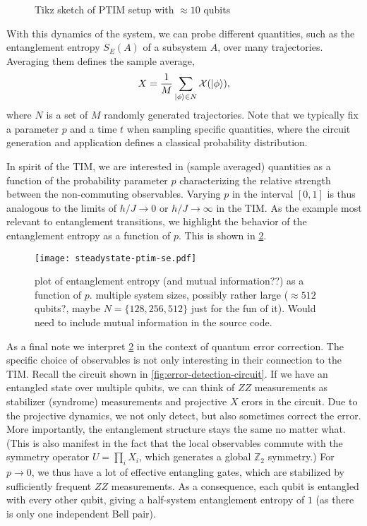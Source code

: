 \begin{figure}[t]
  \centering
  
  \caption{Tikz sketch of PTIM setup with $\approx 10$ qubits}
  \label{fig:ptim-circuit}
\end{figure}

With this dynamics of the system, we can probe different quantities, such as
the entanglement entropy $S_E(A)$ of a subsystem $A$, over many trajectories.
Averaging them defines the sample average,
\begin{align}
  X = \frac{1}{M} \sum_{\ket{\phi} \in N} \mathcal{X}(\ket{\phi})
,\end{align}
where $N$ is a set of $M$ randomly generated trajectories. Note that we
typically fix a parameter $p$ and a time $t$ when sampling specific quantities,
where the circuit generation and application defines a classical probability
distribution. 

In spirit of the TIM, we are interested in (sample averaged) quantities as a
function of the probability parameter $p$ characterizing the relative strength
between the non-commuting observables. Varying $p$ in the interval $[0,1]$ is
thus analogous to the limits of $h /J \to 0$ or  $h /J \to \infty$ in the TIM.
As the example most relevant to entanglement transitions, we highlight the
behavior of the entanglement entropy as a function of $p$. This is shown in
\cref{fig:phase-transition}.

\begin{figure}[t]
  \centering
  \texttt{[image: steadystate-ptim-se.pdf]}
  \caption{plot of entanglement entropy (and mutual information??) as a
  function of $p$. multiple system sizes, possibly rather large ($\approx 512$
qubits?, maybe $N=\{128,256,512\}$ just for the fun of it). Would need to
include mutual information in the source code.}
  \label{fig:phase-transition}
\end{figure}

As a final note we interpret \cref{fig:phase-transition} in the context of
quantum error correction. The specific choice of observables is not only
interesting in their connection to the TIM.  Recall the circuit shown in
\cref{fig:error-detection-circuit}. If we have an entangled state over multiple
qubits, we can think of $ZZ$ measurements as stabilizer (syndrome) measurements
and projective $X$ erors in the circuit. Due to the projective dynamics, we not
only detect, but also sometimes correct the error. More importantly, the
entanglement structure stays the same no matter what. (This is also manifest in
the fact that the local observables commute with the symmetry operator
$U=\prod_i X_i$, which generates a global $\mathbb{Z}_2$ symmetry.) For $p\to
0$, we thus have a lot of effective entangling gates, which are stabilized by
sufficiently frequent $ZZ$ measurements. As a consequence, each qubit is
entangled with every other qubit, giving a half-system entanglement entropy of
$1$ (as there is only one independent Bell pair).

